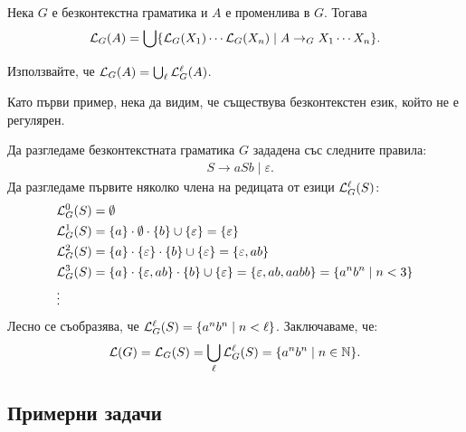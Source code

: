 \begin{corollary}\label{cor:grammar:yield-approximation}
  Нека $G$ е безконтекстна граматика и $A$ е променлива в $G$. Тогава
  \[\mathcal{L}_G(A) = \bigcup\{\mathcal{L}_G(X_1) \cdots \mathcal{L}_G(X_n)  \mid A \to_G X_1 \cdots X_n\}.\]
\end{corollary}
\begin{hint}
  Използвайте, че $\mathcal{L}_G(A) = \bigcup_\ell \mathcal{L}^\ell_G(A)$.
\end{hint}

Като първи пример, нека да видим, че съществува безконтекстен език, който не е регулярен.
\begin{example}\label{ex:grammar:anbn}
  Да разгледаме безконтекстната граматика $G$ зададена със следните правила:
  \begin{align*}
    & S \to aSb \mid \varepsilon.
  \end{align*}
  Да разгледаме първите няколко члена на редицата от езици $\mathcal{L}^\ell_G(S)$:
  \begin{align*}
    & \mathcal{L}^0_G(S) = \emptyset\\
    & \mathcal{L}^1_G(S) = \{a\} \cdot \emptyset \cdot \{b\} \cup \{\varepsilon\} = \{\varepsilon\}\\
    & \mathcal{L}^{2}_G(S) = \{a\} \cdot \{\varepsilon\} \cdot \{b\} \cup \{\varepsilon\} = \{\varepsilon, ab\}\\
    & \mathcal{L}^{3}_G(S) = \{a\} \cdot \{\varepsilon, ab\} \cdot \{b\} \cup \{\varepsilon\} = \{\varepsilon,ab,aabb\} = \{a^nb^n \mid n < 3\}\\
    & \vdots
  \end{align*}
  Лесно се съобразява, че $\mathcal{L}^\ell_G(S) = \{a^nb^n \mid n < \ell\}$.
  Заключаваме, че:
  \[\mathcal{L}(G) = \mathcal{L}_G(S) = \bigcup_{\ell}\mathcal{L}^\ell_G(S) = \{a^nb^n \mid n\in\mathbb{N}\}.\]
\end{example}


\subsection*{Примерни задачи}


